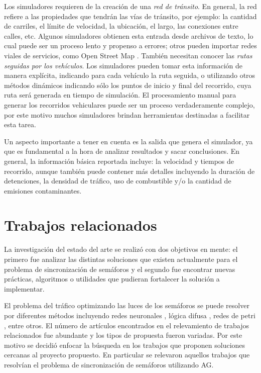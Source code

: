 Los simuladores requieren de la creación de una \emph{red de tránsito}. En general, la red refiere a las propiedades que tendrán las vías de tránsito, por ejemplo: la cantidad de carriles, el límite de velocidad, la ubicación, el largo, las conexiones entre calles, etc. Algunos simuladores obtienen esta entrada desde archivos de texto, lo cual puede ser un proceso lento y propenso a errores; otros pueden importar redes viales de servicios, como Open Street Map \citep{OSM}. También necesitan conocer las\emph{ rutas seguidas por los vehículos}. Los simuladores pueden tomar esta información de manera explícita, indicando para cada vehículo la ruta seguida, o utilizando otros métodos dinámicos indicando sólo los puntos de inicio y final del recorrido, cuya ruta será generada en tiempo de simulación. El procesamiento manual para generar los recorridos vehiculares puede ser un proceso verdaderamente complejo, por este motivo muchos simuladores brindan herramientas destinadas a facilitar esta tarea.

Un aspecto importante a tener en cuenta es la salida que genera el simulador, ya que es fundamental a la hora de analizar resultados y sacar conclusiones. En general, la información básica reportada incluye: la velocidad y tiempos de recorrido, aunque también puede contener más detalles incluyendo la duración de detenciones, la densidad de tráfico, uso de combustible y/o la cantidad de emisiones contaminantes.  
 
\section{Trabajos relacionados}

La investigación del estado del arte se realizó con dos objetivos en mente: el primero fue analizar las distintas soluciones que existen actualmente para el problema de sincronización de semáforos y el segundo fue encontrar nuevas prácticas, algoritmos o utilidades que pudieran fortalecer la solución a implementar.

El problema del tráfico optimizando las luces de los semáforos se puede resolver por diferentes métodos incluyendo  redes neuronales \citep{Lopez1999}, lógica difusa \citep{Lim2001}, redes de petri \citep{DiFebbraro2002}, entre otros. El número de artículos encontrados en el relevamiento de trabajos relacionados fue abundante y los tipos de propuesta fueron variadas. Por este motivo se decidió enfocar la búsqueda en los trabajos que proponen soluciones cercanas al proyecto propuesto. En particular se relevaron aquellos trabajos que resolvían el problema de sincronización de semáforos utilizando AG.

